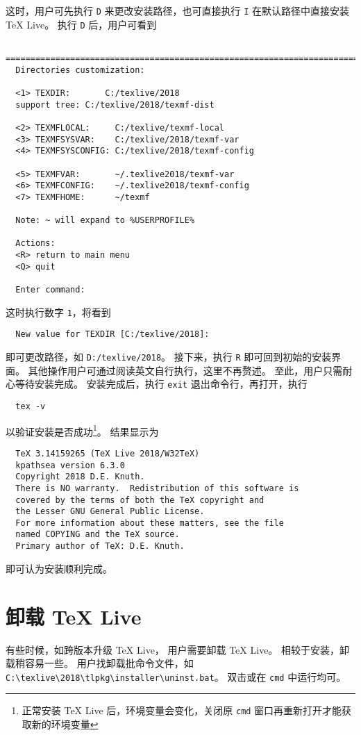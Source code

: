 \documentclass{ctexart}
\begin{document}
这时，用户可先执行 \texttt{D} 来更改安装路径，也可直接执行 \texttt{I} 在默认路径中直接安装 \TeX{} Live。
执行 \texttt{D} 后，用户可看到
\begin{lstlisting}
  ==============================================================================
  Directories customization:
  
  <1> TEXDIR:       C:/texlive/2018
  support tree: C:/texlive/2018/texmf-dist
  
  <2> TEXMFLOCAL:     C:/texlive/texmf-local
  <3> TEXMFSYSVAR:    C:/texlive/2018/texmf-var
  <4> TEXMFSYSCONFIG: C:/texlive/2018/texmf-config
  
  <5> TEXMFVAR:       ~/.texlive2018/texmf-var
  <6> TEXMFCONFIG:    ~/.texlive2018/texmf-config
  <7> TEXMFHOME:      ~/texmf
  
  Note: ~ will expand to %USERPROFILE%
  
  Actions:
  <R> return to main menu
  <Q> quit
  
  Enter command:
\end{lstlisting}
这时执行数字 \texttt{1}，将看到
\begin{lstlisting}
  New value for TEXDIR [C:/texlive/2018]:
\end{lstlisting}
即可更改路径，如 \texttt{D:/texlive/2018}。
接下来，执行 \texttt{R} 即可回到初始的安装界面。
其他操作用户可通过阅读英文自行执行，这里不再赘述。
至此，用户只需耐心等待安装完成。
安装完成后，执行 \texttt{exit} 退出命令行，再打开，执行
\begin{lstlisting}
  tex -v
\end{lstlisting}
以验证安装是否成功\footnote{正常安装 \TeX{} Live 后，环境变量会变化，关闭原 \texttt{cmd} 窗口再重新打开才能获取新的环境变量}。
结果显示为
\begin{lstlisting}
  TeX 3.14159265 (TeX Live 2018/W32TeX)
  kpathsea version 6.3.0
  Copyright 2018 D.E. Knuth.
  There is NO warranty.  Redistribution of this software is
  covered by the terms of both the TeX copyright and
  the Lesser GNU General Public License.
  For more information about these matters, see the file
  named COPYING and the TeX source.
  Primary author of TeX: D.E. Knuth.
\end{lstlisting}
即可认为安装顺利完成。

\section{卸载 \TeX{} Live}
有些时候，如跨版本升级 \TeX{} Live， 用户需要卸载 \TeX{} Live。
相较于安装，卸载稍容易一些。
用户找卸载批命令文件，如 \texttt{C:\textbackslash texlive\textbackslash 2018\textbackslash tlpkg\textbackslash installer\textbackslash uninst.bat}。
双击或在 \texttt{cmd} 中运行均可。
\end{document}
